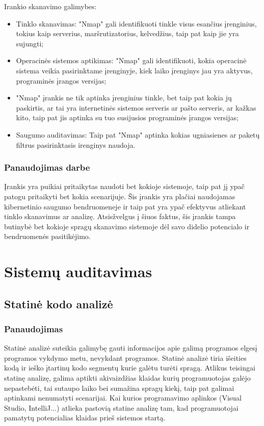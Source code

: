\documentclass[a4paper,12pt,fleqn]{article}
\begin{document}
Irankio skanavimo galimybes:
\begin{itemize}
	\item Tinklo skanavimas: "Nmap" gali identifikuoti tinkle visus esančius įrenginius, tokius kaip serverius, maršrutizatorius, kelvedžius, taip pat kaip jie yra sujungti;
	\item Operacinės sistemos aptikimas: "Nmap" gali identifikuoti, kokia operacinė sistema veikia pasirinktame įrenginyje, kiek laiko įrenginys jau yra aktyvus, programinės įrangos versijas;
	\item "Nmap" įrankis ne tik aptinka įrenginius tinkle, bet taip pat kokia jų paskirtis, ar tai yra internetinės sistemos serveris ar pašto serveris, ar kažkas kito, taip pat jis aptinka su tuo susijusios programinės įrangos versijas;
	\item Saugumo auditavimas: Taip pat "Nmap" aptinka kokias ugniasienes ar paketų filtrus pasirinktasis irenginys naudoja.
\end{itemize}


\subsubsection{Panaudojimas darbe}

Įrankis yra puikiai pritaikytas naudoti bet kokioje sistemoje, taip pat jį ypač patogu pritaikyti bet kokia scenarijuje. Šis įrankis yra plačiai naudojamas kibernetinio saugumo bendruomeneje ir taip pat yra ypač efektyvus atliekant tinklo skanavimus ar analizę. Atsisžvelgus į šiuos faktus, šis įrankis tampa butinybė bet kokioje spragų skanavimo sistemoje dėl savo didelio potencialo ir bendruomenės pasitikėjimo.

\newpage
\section{Sistemų auditavimas}
\label{sec:motivation}

\subsection{Statinė kodo analizė}
\label{sec:example}

\subsubsection{Panaudojimas}
\label{sec:data}
Statinė analizė suteikia galimybę gauti informacijos apie galimą programos elgesį programos vykdymo metu, nevykdant programos. Statinė analizė tiria išeities kodą ir ieško įtartinų kodo segmentų kurie galėtu turėti spragą. Atlikus teisingai statinę analizę, galima aptikti akivaizdžias klaidas kurių programuotojas galėjo nepastebėti, tai sutaupo laiko bei sumažina spragų kiekį, taip pat galimai aptinkami nenumatyti scenarijai. Kai kurios programavimo aplinkos (Visual Studio, IntelliJ...) atlieka pastovią statine analizę tam, kad programuotojai pamatytų potencialias klaidas prieš sistemos startą. \cite{Cowan:2003:SSO:858866.859050}
\end{document}
